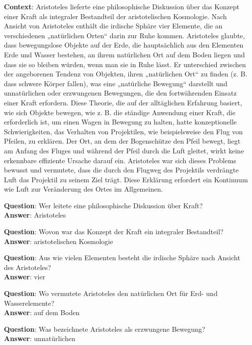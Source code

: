 \begin{examples}
  \label{ex:xquad}
  \item \textbf{Context}:
        Aristoteles lieferte eine philosophische Diskussion über das Konzept einer Kraft
        als integraler Bestandteil der aristotelischen Kosmologie. Nach Ansicht von Aristoteles enthält
        die irdische Sphäre vier Elemente, die an verschiedenen „natürlichen Orten“ darin zur Ruhe
        kommen. Aristoteles glaubte, dass bewegungslose Objekte auf der Erde, die hauptsächlich aus den
        Elementen Erde und Wasser bestehen, an ihrem natürlichen Ort auf dem Boden liegen und dass sie so
        bleiben würden, wenn man sie in Ruhe lässt. Er unterschied zwischen der angeborenen Tendenz von
        Objekten, ihren „natürlichen Ort“ zu finden (z. B. dass schwere Körper fallen), was eine
        „natürliche Bewegung“ darstellt und unnatürlichen oder erzwungenen Bewegungen, die den
        fortwährenden Einsatz einer Kraft erfordern. Diese Theorie, die auf der alltäglichen Erfahrung
        basiert, wie sich Objekte bewegen, wie z. B. die ständige Anwendung einer Kraft, die erforderlich
        ist, um einen Wagen in Bewegung zu halten, hatte konzeptionelle Schwierigkeiten, das Verhalten von
        Projektilen, wie beispielsweise den Flug von Pfeilen, zu erklären. Der Ort, an dem der
        Bogenschütze den Pfeil bewegt, liegt am Anfang des Fluges und während der Pfeil durch die Luft
        gleitet, wirkt keine erkennbare effiziente Ursache darauf ein. Aristoteles war sich dieses
        Problems bewusst und vermutete, dass die durch den Flugweg des Projektils verdrängte Luft das
        Projektil zu seinem Ziel trägt. Diese Erklärung erfordert ein Kontinuum wie Luft zur
        Veränderung des Ortes im Allgemeinen.

        \textbf{Question}: Wer leitete eine philosophische Diskussion über Kraft?\\
        \textbf{Answer}: Aristoteles

        \textbf{Question}: Wovon war das Konzept der Kraft ein integraler Bestandteil?\\
        \textbf{Answer}: aristotelischen Kosmologie

        \textbf{Question}: Aus wie vielen Elementen besteht die irdische Sphäre nach Ansicht des Aristoteles?\\
        \textbf{Answer}: vier

        \textbf{Question}: Wo vermutete Aristoteles den natürlichen Ort für Erd- und Wasserelemente?\\
        \textbf{Answer}: auf dem Boden

        \textbf{Question}: Was bezeichnete Aristoteles als erzwungene Bewegung?\\
        \textbf{Answer}: unnatürlichen
\end{examples}

